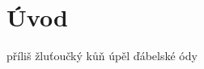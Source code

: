 \documentclass[a4paper,12pt]{report}
\theoremstyle{definition} \newtheorem{definice}[veta]{Definice}
\theoremstyle{remark}
\begin{document}
\chapter*{Úvod} 
\pagestyle{plain}
\setcounter{page}{1}


příliš žluťoučký kůň úpěl ďábelské ódy



\end{document}
